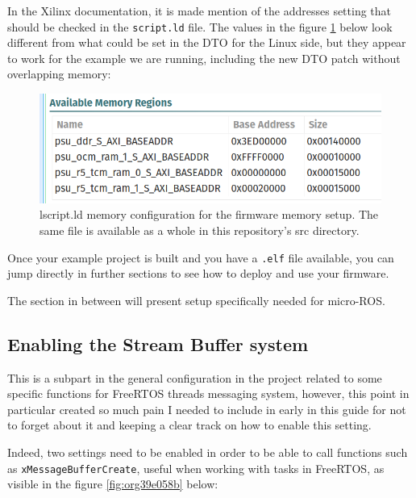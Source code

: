 \documentclass[10pt]{article}
\begin{document}
\pagebreak
In the Xilinx documentation, it is made mention of the addresses setting that should be checked in the \texttt{script.ld} file.
The values in the figure \ref{fig:org24c078c} below look different from what could be set in the DTO for the Linux side, but they appear to
work for the example we are running, including the new DTO patch without overlapping memory:


\begin{figure}[htbp]
\centering
\includegraphics[width=.6\textwidth]{./img/vitis_new/project_mem.png}
\caption{\label{fig:org24c078c}lscript.ld memory configuration for the firmware memory setup. The same file is available as a whole in this repository's src directory.}
\end{figure}


Once your example project is built and you have a \texttt{.elf} file available, you can
jump directly in further sections to see how to deploy and use your firmware.

The section in between will present setup specifically needed for micro-ROS.

\subsection{Enabling the Stream Buffer system}
\label{sec:orga4feb51}
This is a subpart in the general configuration in the project related to some specific
functions for FreeRTOS threads messaging system, however, this point in particular
created so much pain I needed to include in early in this guide for not to forget about it
and keeping a clear track on how to enable this setting.

Indeed, two settings need to be enabled in order to be able to call
functions such as \texttt{xMessageBufferCreate}, useful when working with tasks
in FreeRTOS, as visible in the figure \ref{fig:org39e058b} below:
\end{document}
